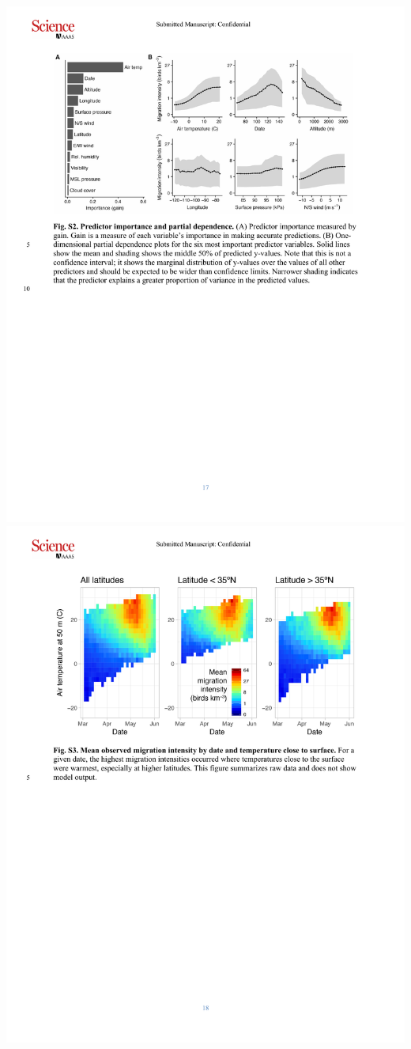 \documentclass[a4paper, twoside]{templates/ociamthesis}
\begin{document}
\includegraphics[width=1\linewidth]{pdf_chapters/forecast/forecast_supp_crop_Part07}
\includegraphics[width=1\linewidth]{pdf_chapters/forecast/forecast_supp_crop_Part08}
\end{document}
